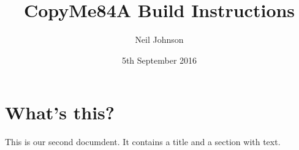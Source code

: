 \documentclass[a4paper, 11pt]{article}
\begin{document}
\title{CopyMe84A Build Instructions}
\author{Neil Johnson}
\date{5th September 2016}
\maketitle
\section{What's this?}
This is our second documdent. It contains a title and a section with text.
\end{document}
